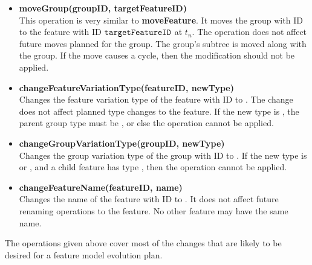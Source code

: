 \begin{itemize}
  \item \textbf{moveGroup(groupID, targetFeatureID)} \\
    This operation is very similar to \textbf{moveFeature}. It moves the group with ID  to the feature with ID $\texttt{targetFeatureID}$ at $t_n$. The operation does not affect future moves planned for the group. The group's subtree is moved along with the group. If the move causes a cycle, then the modification should not be applied.
  \item \textbf{changeFeatureVariationType(featureID, newType)} \\
    Changes the feature variation type of the feature with ID  to . The change does not affect planned type changes to the feature. If the new type is \mandatory{}, the parent group type must be \andtype{}, or else the operation cannot be applied.
  \item \textbf{changeGroupVariationType(groupID, newType)}\\
    Changes the group variation type of the group with ID  to . If the new type is \ortype{} or \xortype{}, and a child feature has type \mandatory{}, then the operation cannot be applied. 
  \item \textbf{changeFeatureName(featureID, name)}\\
    Changes the name of the feature with ID  to . It does not affect future renaming operations to the feature. No other feature may have the same name.
\end{itemize}

The operations given above cover most of the changes that are likely to be desired for a feature model evolution plan.
